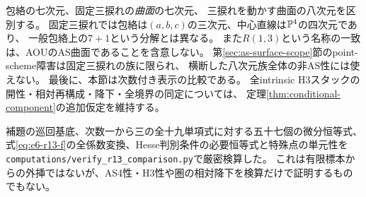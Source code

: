 \begin{remark}[三つの異なる比較問題]\label{rem:e6-r13-scope}
包絡の七次元、固定三捩れの\emph{曲面}の七次元、
三捩れを動かす曲面の八次元を区別する。
固定三捩れでは包絡は$(a,b,c)$の三次元、中心直線は$\mathbb P^4$の四次元であり、
一般包絡上の$7+1$という分解とは異なる。
また$R(1,3)$という名称の一致は、AOUのAS曲面であることを含意しない。
第\ref{sec:as-surface-scope}節のpoint-scheme障害は固定三捩れの族に限られ、
横断した八次元族全体の非AS性には使えない。
最後に、本節は次数付き表示の比較である。
全intrinsic H3スタックの開性・相対再構成・降下・全境界の同定については、
定理\ref{thm:conditional-component}の追加仮定を維持する。
\end{remark}

補題の巡回基底、次数一から三の全十九単項式に対する五十七個の微分恒等式、
式\eqref{eq:e6-r13-f}の全係数変換、Hesse判別条件の必要恒等式と特殊点の単元性を
\texttt{computations/verify\_r13\_comparison.py}で厳密検算した。
これは有限標本からの外挿ではないが、AS4性・H3性や圏の相対降下を検算だけで証明するものでもない。
